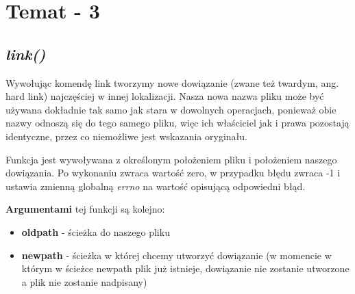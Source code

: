 \documentclass{article}
\begin{document}
  
\section{Temat - 3}
\subsection{\textit{link()}}
Wywołując komendę link tworzymy nowe dowiązanie (zwane też twardym, ang. hard link) najczęściej w innej lokalizacji. Nasza nowa nazwa pliku może być używana dokładnie tak samo jak stara w dowolnych operacjach, ponieważ obie nazwy odnoszą się do tego samego pliku, więc ich właściciel jak i prawa pozostają identyczne, przez co niemożliwe jest wskazania oryginału.

Funkcja jest wywoływana z określonym położeniem pliku i położeniem naszego dowiązania. Po wykonaniu zwraca wartość zero, w przypadku błędu zwraca -1 i ustawia zmienną globalną \textit{errno} na wartość opisującą odpowiedni błąd.


\textbf{Argumentami} tej funkcji są kolejno:
\begin{itemize}
\item \textbf{oldpath} - ścieżka do naszego pliku
\item \textbf{newpath} - ścieżka w której chcemy utworzyć dowiązanie (w momencie w którym w ścieżce newpath plik już istnieje, dowiązanie nie zostanie utworzone a plik nie zostanie nadpisany)
\end{itemize}
\end{document}
